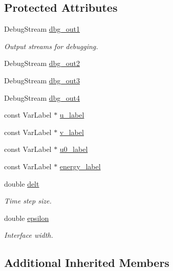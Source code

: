 \subsection*{Protected Attributes}
\begin{DoxyCompactItemize}
\item 
Debug\+Stream \hyperlink{classUintah_1_1PhaseField_1_1Benchmark03_a2ed09d87caef15cfaf3b91828b0733d6}{dbg\+\_\+out1}
\begin{DoxyCompactList}\small\item\em Output streams for debugging. \end{DoxyCompactList}\item 
Debug\+Stream \hyperlink{classUintah_1_1PhaseField_1_1Benchmark03_acbd79e4c8670dd870251a5d72fcac8d1}{dbg\+\_\+out2}
\item 
Debug\+Stream \hyperlink{classUintah_1_1PhaseField_1_1Benchmark03_a8cc0f383b9728ff5e231141d0c27f932}{dbg\+\_\+out3}
\item 
Debug\+Stream \hyperlink{classUintah_1_1PhaseField_1_1Benchmark03_a29cd210e788cbabd667218cad16139d6}{dbg\+\_\+out4}
\item 
const Var\+Label $\ast$ \hyperlink{classUintah_1_1PhaseField_1_1Benchmark03_ab692d6e3cd312a0a07f0d02ce4819e22}{u\+\_\+label}
\item 
const Var\+Label $\ast$ \hyperlink{classUintah_1_1PhaseField_1_1Benchmark03_a339f3cb33651e391b9fda92ced34870b}{v\+\_\+label}
\item 
const Var\+Label $\ast$ \hyperlink{classUintah_1_1PhaseField_1_1Benchmark03_af60ffd6c85ad808b303a8faac0c9dce8}{u0\+\_\+label}
\item 
const Var\+Label $\ast$ \hyperlink{classUintah_1_1PhaseField_1_1Benchmark03_a45df7033030bf7cf92dae0b901d30410}{energy\+\_\+label}
\item 
double \hyperlink{classUintah_1_1PhaseField_1_1Benchmark03_a2ed55bf5e285b705c3b3a895dc03bd57}{delt}
\begin{DoxyCompactList}\small\item\em Time step size. \end{DoxyCompactList}\item 
double \hyperlink{classUintah_1_1PhaseField_1_1Benchmark03_ab486022710d8d32de2c7aa2dcf017e4a}{epsilon}
\begin{DoxyCompactList}\small\item\em Interface width. \end{DoxyCompactList}\end{DoxyCompactItemize}
\subsection*{Additional Inherited Members}


